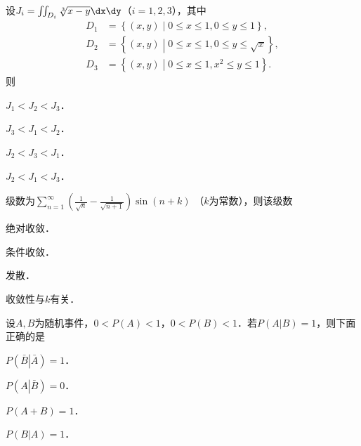 \documentclass[plain,noanswer,medmath]{../../template/jnuexam}
\begin{document}










\begin{problem}
设$J_i = \iint_{D_i}\sqrt[3]{x-y}\dx\dy$（$i=1,2,3$），其中
\begin{align*}
  D_1 &  = \left\{(x,y) \middle| 0 \le x \le 1,0 \le y \le 1 \right\}, \\
  D_2 &  = \left\{(x,y) \middle| 0 \le x \le 1,0 \le y \le \sqrt{x} \right\}, \\
  D_3 &  = \left\{(x,y) \middle| 0 \le x \le 1,x^2 \le y \le 1 \right\}.
\end{align*}
则\pickout{}
\begin{abcd}
\item $J_1 < J_2 < J_3$．
\item $J_3 < J_1 < J_2$．
\item $J_2 < J_3 < J_1$．
\item $J_2 < J_1 < J_3$．
\end{abcd}
\end{problem}


\begin{problem}
级数为$\sum_{n = 1}^{\infty}\left(\frac{1}{\sqrt{n}} - \frac{1}{\sqrt{n + 1}} \right)\sin(n + k)$%
（$k$为常数），则该级数\pickout{}
\begin{abcd}
\item 绝对收敛．
\item 条件收敛．
\item 发散．
\item 收敛性与$k$有关．
\end{abcd}
\end{problem}






\begin{problem}
设$A,B$为随机事件，$0 < P(A) < 1$，$0 < P(B) < 1$．若$P(A\left| B \right.) = 1$，则下面正确的是\pickout{}
\begin{abcd}
\item $P(\bar B\left| \bar A \right.) = 1$．
\item $P(A\left| \bar B \right.) = 0$．
\item $P(A + B) = 1$．
\item $P(B\left| A \right.) = 1$．
\end{abcd}
\end{problem}
\end{document}
